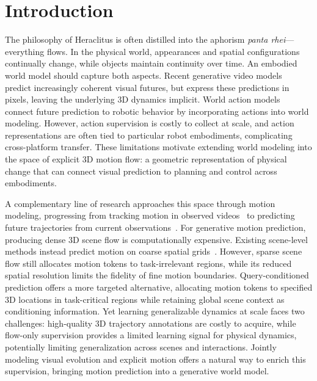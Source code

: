 \section{Introduction}
\label{sec:introduction}

The philosophy of Heraclitus is often distilled into the
aphorism \textit{panta rhei}---everything flows.
In the physical world, appearances and spatial configurations
continually change, while objects maintain continuity over time.
An embodied world model should capture both aspects.
Recent generative video models~\citep{wan2025wan,seedance2026seedance2}
predict increasingly coherent visual futures, but express
these predictions in pixels, leaving the underlying 3D
dynamics implicit.
World action models~\citep{zhou2026zerowam,yuan2026fastwam,nvidia2026cosmos3,ye2026dreamzero}
connect future prediction to robotic behavior by incorporating
actions into world modeling.
However, action supervision is costly to collect at scale,
and action representations are often tied to particular
robot embodiments, complicating cross-platform transfer.
These limitations motivate extending world modeling into
the space of explicit 3D motion flow: a geometric representation
of physical change that can connect visual prediction to
planning and control across embodiments.

A complementary line of research approaches this space
through motion modeling, progressing from tracking motion
in observed videos~\citep{lu2026track4world,luo20264rc} to predicting future trajectories
from current observations~\citep{zhang2026molmomotion,lee2026mu_0}.
For generative motion prediction, producing dense 3D
scene flow is computationally expensive.
Existing scene-level methods instead predict motion
on coarse spatial grids~\citep{lee2026tracegen,li2026egowam}.
However, sparse scene flow still allocates motion tokens
to task-irrelevant regions, while its reduced spatial
resolution limits the fidelity of fine motion boundaries.
Query-conditioned prediction offers a more targeted
alternative, allocating motion tokens to specified 3D
locations in task-critical regions while retaining global
scene context as conditioning information.
Yet learning generalizable dynamics at scale faces two
challenges: high-quality 3D trajectory annotations are costly
to acquire, while flow-only supervision provides a limited
learning signal for physical dynamics, potentially limiting
generalization across scenes and interactions.
Jointly modeling visual evolution and explicit motion
offers a natural way to enrich this supervision,
bringing motion prediction into a generative world model.


